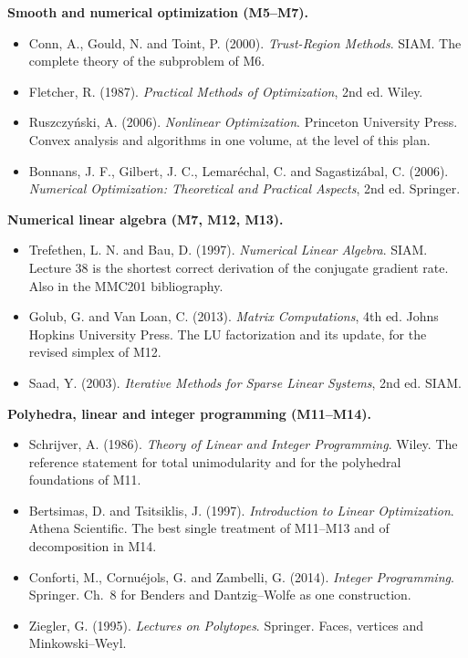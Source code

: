 \documentclass[11pt,a4paper]{article}
\begin{document}
\textbf{Smooth and numerical optimization (M5--M7).}
\begin{itemize}[label={}]
\item[{[B11]}] Conn, A., Gould, N. and Toint, P. (2000). \emph{Trust-Region Methods}. SIAM.
The complete theory of the subproblem of M6.
\item[{[B12]}] Fletcher, R. (1987). \emph{Practical Methods of Optimization}, 2nd ed. Wiley.
\item[{[B13]}] Ruszczy\'nski, A. (2006). \emph{Nonlinear Optimization}. Princeton University
Press. Convex analysis and algorithms in one volume, at the level of this plan.
\item[{[B14]}] Bonnans, J. F., Gilbert, J. C., Lemar\'echal, C. and Sagastiz\'abal, C. (2006).
\emph{Numerical Optimization: Theoretical and Practical Aspects}, 2nd ed. Springer.
\end{itemize}

\textbf{Numerical linear algebra (M7, M12, M13).}
\begin{itemize}[label={}]
\item[{[B15]}] Trefethen, L. N. and Bau, D. (1997). \emph{Numerical Linear Algebra}. SIAM.
Lecture 38 is the shortest correct derivation of the conjugate gradient rate. Also in the
MMC201 bibliography.
\item[{[B16]}] Golub, G. and Van Loan, C. (2013). \emph{Matrix Computations}, 4th ed. Johns
Hopkins University Press. The LU factorization and its update, for the revised simplex of M12.
\item[{[B17]}] Saad, Y. (2003). \emph{Iterative Methods for Sparse Linear Systems}, 2nd ed.
SIAM.
\end{itemize}

\textbf{Polyhedra, linear and integer programming (M11--M14).}
\begin{itemize}[label={}]
\item[{[B18]}] Schrijver, A. (1986). \emph{Theory of Linear and Integer Programming}. Wiley.
The reference statement for total unimodularity and for the polyhedral foundations of M11.
\item[{[B19]}] Bertsimas, D. and Tsitsiklis, J. (1997). \emph{Introduction to Linear
Optimization}. Athena Scientific. The best single treatment of M11--M13 and of decomposition
in M14.
\item[{[B20]}] Conforti, M., Cornu\'ejols, G. and Zambelli, G. (2014). \emph{Integer
Programming}. Springer. Ch.~8 for Benders and Dantzig--Wolfe as one construction.
\item[{[B21]}] Ziegler, G. (1995). \emph{Lectures on Polytopes}. Springer. Faces, vertices and
Minkowski--Weyl.
\end{itemize}
\end{document}
